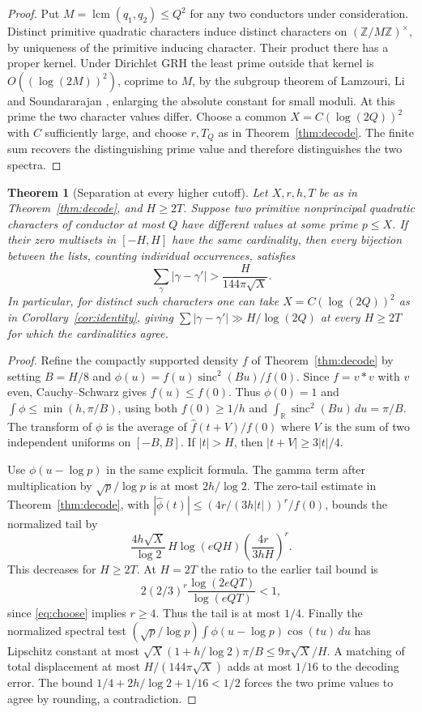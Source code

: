 \documentclass[11pt,letterpaper]{article}
\newtheorem{theorem}{Theorem}[section]
\theoremstyle{remark}\newtheorem{remark}[theorem]{Remark}
\begin{document}
\begin{proof}
Put $M=\operatorname{lcm}(q_1,q_2)\le Q^2$ for any two conductors under consideration. Distinct primitive quadratic characters induce distinct characters on $(\mathbb Z/M\mathbb Z)^\times$, by uniqueness of the primitive inducing character. Their product there has a proper kernel. Under Dirichlet GRH the least prime outside that kernel is $O((\log(2M))^2)$, coprime to $M$, by the subgroup theorem of Lamzouri, Li and Soundararajan \cite[Thm.~1.1]{lls}, enlarging the absolute constant for small moduli. At this prime the two character values differ.
Choose a common $X=C(\log(2Q))^2$ with $C$ sufficiently large, and choose $r,T_Q$ as in Theorem~\ref{thm:decode}. The finite sum recovers the distinguishing prime value and therefore distinguishes the two spectra.
\end{proof}

\begin{theorem}[Separation at every higher cutoff]\label{thm:displacement}
Let $X,r,h,T$ be as in Theorem~\ref{thm:decode}, and $H\ge2T$.
Suppose two primitive nonprincipal quadratic characters of conductor at
most $Q$ have different values at some prime $p\le X$. If their zero
multisets in $[-H,H]$ have the same cardinality, then every
bijection between the lists, counting individual occurrences, satisfies
\[
        \sum_{\gamma}|\gamma-\gamma'|>
                         \frac{H}{144\pi\sqrt X}.
\]
In particular, for distinct such characters one can take
$X=C(\log(2Q))^2$ as in Corollary~\ref{cor:identity}, giving
$\sum |\gamma-\gamma'|\gg H/\log(2Q)$ at every $H\ge2T$ for
which the cardinalities agree.
\end{theorem}

\begin{proof}
Refine the compactly supported density $f$ of Theorem~\ref{thm:decode}
by setting $B=H/8$ and
$\phi(u)=f(u)\operatorname{sinc}^2(Bu)/f(0)$.
Since $f=v*v$ with $v$ even, Cauchy--Schwarz gives $f(u)\le f(0)$.
Thus $\phi(0)=1$ and $\int\phi\le\min(h,\pi/B)$, using both
$f(0)\ge1/h$ and $\int_{\mathbb R}\operatorname{sinc}^2(Bu)\,du=\pi/B$.
The transform of $\phi$ is the average of $\widehat f(t+V)/f(0)$
where $V$ is the sum of two independent uniforms on $[-B,B]$.
If $|t|>H$, then $|t+V|\ge3|t|/4$.

Use $\phi(u-\log p)$ in the same explicit formula. The gamma term
after multiplication by $\sqrt p/\log p$ is at most $2h/\log 2$.
The zero-tail estimate in Theorem~\ref{thm:decode}, with
$|\widehat\phi(t)|\le (4r/(3h|t|))^r/f(0)$, bounds the normalized
tail by
\[
 \frac{4h\sqrt X}{\log 2}\,H\log(eQH)
                  \left(\frac{4r}{3hH}\right)^r.
\]
This decreases for $H\ge2T$. At $H=2T$ the ratio to the earlier tail bound is
\[2(2/3)^r\frac{\log(2eQT)}{\log(eQT)}<1,\]
since \eqref{eq:choose} implies $r\ge4$. Thus the tail is at most
$1/4$. Finally the normalized spectral test
$(\sqrt p/\log p)\int\phi(u-\log p)\cos(tu)\,du$ has Lipschitz
constant at most
$\sqrt X(1+h/\log 2)\pi/B\le9\pi\sqrt X/H$.
A matching of total displacement at most $H/(144\pi\sqrt X)$ adds at
most $1/16$ to the decoding error. The bound
$1/4+2h/\log2+1/16<1/2$ forces the two
prime values to agree by rounding, a contradiction.
\end{proof}
\end{document}
